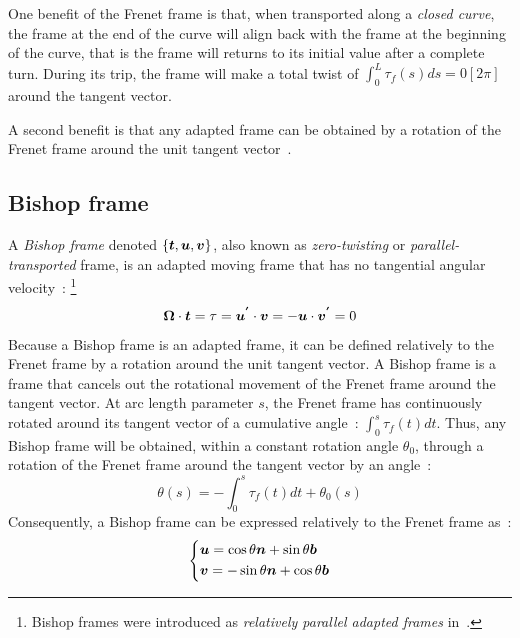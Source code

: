 One benefit of the Frenet frame is that, when transported along a \emph{closed curve}, the frame at the end of the curve will align back with the frame at the beginning of the curve, that is the frame will returns to its initial value after a complete turn. During its trip, the frame will make a total twist of $\int_0^L \tau_f(s)ds = 0[2\pi]$ around the tangent vector.

A second benefit is that any adapted frame can be obtained by a rotation of the Frenet frame around the unit tangent vector~\cite[p.2]{Guggenheimer1989}.

\subsection{Bishop frame}\label{sec:bishop}

A \emph{Bishop frame} denoted $\{\boldsymbol{t},\boldsymbol{u},\boldsymbol{v}\}$, also known as \emph{zero-twisting} or \emph{parallel-transported} frame, is an adapted moving frame that has no tangential angular velocity~: \footnote{Bishop frames were introduced as \emph{relatively parallel adapted frames} in~\cite{Bishop1975}.}
\begin{equation}
	\boldsymbol{\Omega} \cdot \boldsymbol{t} = \tau =\boldsymbol{u^{'}} \cdot \boldsymbol{v} = - \boldsymbol{u} \cdot \boldsymbol{v^{'}} = 0
	\label{eq:null_velocity}
\end{equation}
Because a Bishop frame is an adapted frame, it can be defined relatively to the Frenet frame by a rotation around the unit tangent vector. A Bishop frame is a frame that cancels out the rotational movement of the Frenet frame around the tangent vector. At arc length parameter $s$, the Frenet frame has continuously rotated around its tangent vector of a cumulative angle~: $\int_0^s \tau_f(t)dt$. Thus, any Bishop frame will be obtained, within a constant rotation angle $\theta_0$, through a rotation of the Frenet frame around the tangent vector by an angle~:
\begin{equation}
	\theta(s)  =  - \int_0^s \tau_f(t)dt + \theta_0(s)
\end{equation}
Consequently, a Bishop frame can be expressed relatively to the Frenet frame as~:
\begin{equation}
	\left\{
	\begin{aligned}
		&\boldsymbol{u} = \cos \theta \boldsymbol{n} +  \sin \theta \boldsymbol{b}\\
		&\boldsymbol{v} = -\sin \theta \boldsymbol{n} +  \cos \theta \boldsymbol{b}
	\end{aligned}
	\right.
\end{equation}

